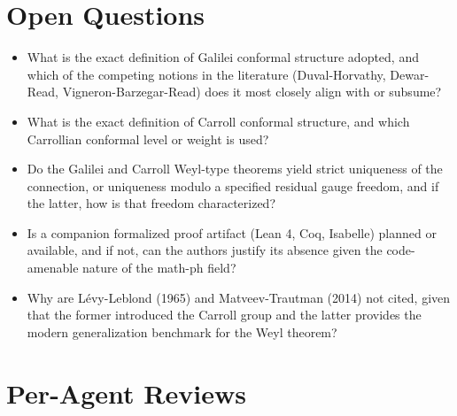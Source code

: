 \documentclass[11pt]{article}
\begin{document}
\section*{Open Questions}
\begin{itemize}[leftmargin=*]
  \item What is the exact definition of Galilei conformal structure adopted, and which of the competing notions in the literature (Duval-Horvathy, Dewar-Read, Vigneron-Barzegar-Read) does it most closely align with or subsume?
  \item What is the exact definition of Carroll conformal structure, and which Carrollian conformal level or weight is used?
  \item Do the Galilei and Carroll Weyl-type theorems yield strict uniqueness of the connection, or uniqueness modulo a specified residual gauge freedom, and if the latter, how is that freedom characterized?
  \item Is a companion formalized proof artifact (Lean 4, Coq, Isabelle) planned or available, and if not, can the authors justify its absence given the code-amenable nature of the math-ph field?
  \item Why are Lévy-Leblond (1965) and Matveev-Trautman (2014) not cited, given that the former introduced the Carroll group and the latter provides the modern generalization benchmark for the Weyl theorem?
\end{itemize}

\section*{Per-Agent Reviews}
\end{document}
